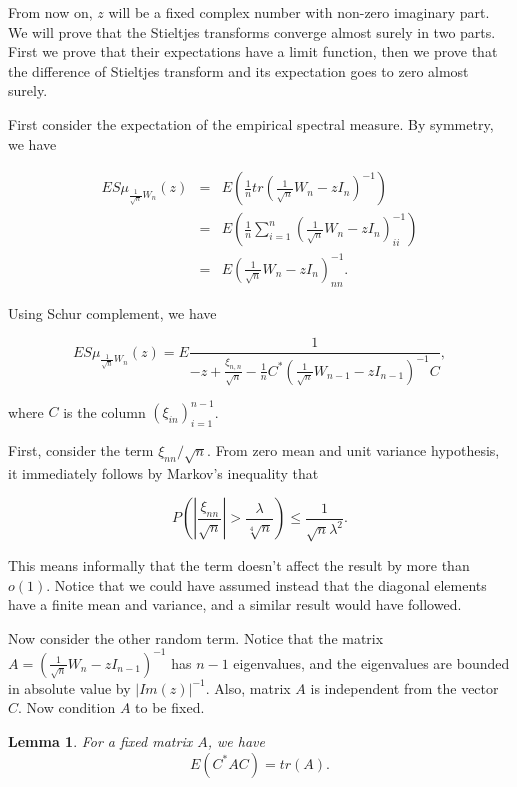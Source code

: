 \documentclass[12pt,a4paper,leqno]{report}
\theoremstyle{plain}
\newtheorem{lem}[equation]{Lemma}
\theoremstyle{definition}
\theoremstyle{remark}
\begin{document}
From now on, $z$ will be a fixed complex number with non-zero imaginary part. We will prove that the Stieltjes transforms converge almost surely in two parts. First we prove that their expectations have a limit function, then we prove that the difference of Stieltjes transform and its expectation goes to zero almost surely.

First consider the expectation of the empirical spectral measure.  By symmetry, we have

\begin{eqnarray*}
ES\mu_{\frac{1}{\sqrt{n}}W_n}(z) & = &
E(\frac{1}{n} tr(\frac{1}{\sqrt{n}}W_n - z I_n)^{-1})\\
& = & E(\frac{1}{n} \sum_{i=1}^n(\frac{1}{\sqrt{n}}W_n - z I_n)^{-1}_{ii})\\
& = & E(\frac{1}{\sqrt{n}}W_n - z I_n)^{-1}_{nn}.
\end{eqnarray*}

Using Schur complement, we have

\begin{equation*}
ES\mu_{\frac{1}{\sqrt{n}}W_n}(z) = E\frac{1}{-z+\frac{\xi_{n,n}}{\sqrt{n}}-\frac{1}{n}C^* (\frac{1}{\sqrt{n}}W_{n-1}-zI_{n-1})^{-1}C},
\end{equation*}

where $C$ is the column $(\xi_{in})_{i=1}^{n-1}$.

First, consider the term $\xi_{nn}/\sqrt{n}$. From zero mean and unit variance hypothesis, it immediately follows by Markov's inequality that

\begin{equation*}
P(|\frac{\xi_{nn}}{\sqrt{n}}|>\frac{\lambda}{\sqrt[4]{n}}) \leq \frac{1}{\sqrt{n}\lambda^2}. 
\end{equation*}

This means informally that the term doesn't affect the result by more than $o(1)$. Notice that we could have assumed instead that the diagonal elements have a finite mean and variance, and a similar result would have followed.

Now consider the other random term. Notice that the matrix $A = (\frac{1}{\sqrt{n}}W_n-zI_{n-1})^{-1}$ has $n-1$ eigenvalues, and the eigenvalues are bounded in absolute value by $|Im(z)|^{-1}$. Also, matrix $A$ is independent from the vector $C$. Now condition $A$ to be fixed.

\begin{lem}
For a fixed matrix $A$, we have
\begin{equation*}
E(C^* A C) = tr(A).
\end{equation*}
\end{lem}
\end{document}
